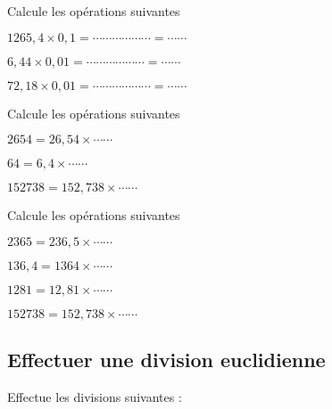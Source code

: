 
Calcule les opérations suivantes

\begin{description}
\item $ 1265,4 \times 0,1  =\cdots \cdots \cdots \cdots\cdots \cdots=\cdots \cdots$
\item $ 6,44 \times 0,01   =\cdots \cdots \cdots \cdots\cdots \cdots=\cdots \cdots$
\item $  72,18 \times 0,01 =\cdots \cdots\cdots \cdots\cdots \cdots =\cdots \cdots  $
\end{description}




Calcule les opérations suivantes

\begin{description}
\item $2654 = 26,54 \times \cdots \cdots $
\item $64 = 6,4 \times \cdots \cdots $
\item $152738 = 152,738 \times \cdots \cdots $
\end{description}



Calcule les opérations suivantes

\begin{description}
\item $2365 = 236,5 \times \cdots \cdots $
\item $136,4 = 1364 \times \cdots \cdots $
\item $1281 = 12,81 \times \cdots \cdots $
\item $152738 = 152,738 \times \cdots \cdots $
\end{description}



\subsection{Effectuer une division euclidienne}


Effectue les divisions suivantes :

